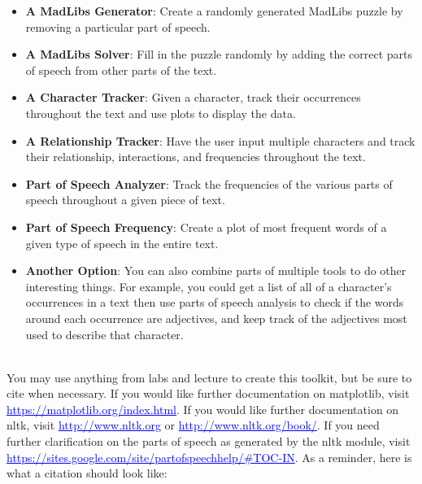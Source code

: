 \documentclass[11pt, letterpaper, onecolumn, oneside, final]{article}
\begin{document}
  \begin{itemize}
      \item \textbf{A MadLibs Generator}: Create a randomly generated MadLibs puzzle by removing a particular part of speech.
            \item \textbf{A MadLibs Solver}: Fill in the puzzle randomly by adding the correct parts of speech from other parts of the text.
      \item \textbf{A Character Tracker}: Given a character, track their occurrences throughout the text and use plots to display the data. 
          \item \textbf{A Relationship Tracker}: Have the user input multiple characters and track their relationship, interactions, and frequencies throughout the text.
      \item \textbf{Part of Speech Analyzer}: Track the frequencies of the various parts of speech throughout a given piece of text.
          \item \textbf{Part of Speech Frequency}: Create a plot of most frequent words of a given type of speech in the entire text.
      \item \textbf{Another Option}: You can also combine parts of multiple tools to do other interesting things. For example, you could get a list of all of a character's occurrences in a text then use parts of speech analysis to check if the words around each occurrence are adjectives, and keep track of the adjectives most used to describe that character. 
  \end{itemize}
  \\
  You may use anything from labs and lecture to create this toolkit, but be sure to cite when necessary. If you would like further documentation on {\consolas matplotlib}, visit \textcolor{blue}{\underline{https://matplotlib.org/index.html}}. If you would like further documentation on {\consolas nltk}, visit \textcolor{blue}{\underline{http://www.nltk.org}} or \textcolor{blue}{\underline{http://www.nltk.org/book/}}. If you need further clarification on the parts of speech as generated by the {\consolas nltk} module, visit \textcolor{blue}{\underline{https://sites.google.com/site/partofspeechhelp/#TOC-IN}}. As a reminder, here is what a citation should look like: \\ 
\end{document}
